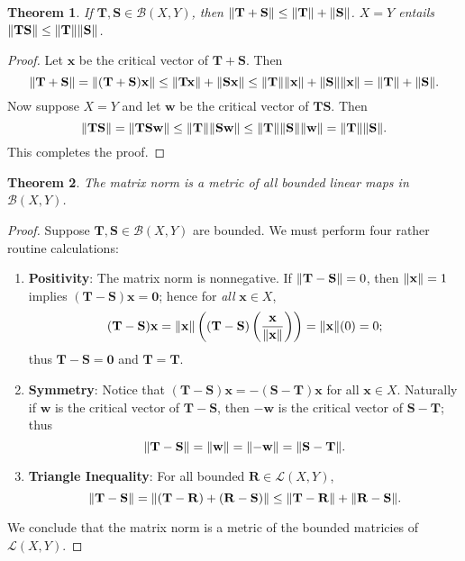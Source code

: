 \documentclass[11pt]{article}
\renewcommand{\vec}[1]{\mathbf{#1}}
\newcommand{\mat}[1]{\mathbf{#1}}
\newtheorem{theorem}{Theorem}
\begin{document}
\begin{theorem}
	If $\mat{T}, \mat{S} \in \mathcal{B}(X, Y)$, then $\norm{\mat{T} + \mat{S}} \le \norm{\mat{T}} + \norm{\mat{S}}$. $X = Y$ entails $\norm{\mat{TS}} \le \norm{\mat{T}} \norm{\mat{S}}$.
\end{theorem}
\begin{adjustwidth}{0.5cm}{}
	\begin{proof}
		Let $\vec{x}$ be the critical vector of $\mat{T} + \mat{S}$. Then
		\[
			\norm{\mat{T} + \mat{S}} = \norm{(\mat{T} + \mat{S})\vec{x}} \le \norm{\mat{T} \vec{x}} + \norm{\mat{S} \vec{x}} \le \norm{\mat{T}} \norm{\vec{x}} + \norm{\mat{S}} \norm{\vec{x}} = \norm{\mat{T}} + \norm{\mat{S}}.
		\]
		Now suppose $X = Y$ and let $\vec{w}$ be the critical vector of $\mat{TS}$. Then
		\[
			\norm{\mat{TS}} = \norm{\mat{TS} \vec{w}} \le \norm{\mat{T}} \norm{\mat{S} \vec{w}} \le \norm{\mat{T}} \norm{\mat{S}} \norm{\vec{w}} = \norm{\mat{T}} \norm{\mat{S}}.
		\]
		This completes the proof.
	\end{proof}
\end{adjustwidth}

\begin{theorem}
  The matrix norm is a metric of all bounded linear maps in $\mathcal{B}(X, Y)$.
\end{theorem}
\begin{adjustwidth}{0.5cm}{}
	\begin{proof}
		Suppose $\mat{T}, \mat{S} \in \mathcal{B}(X, Y)$ are bounded. We must perform four rather routine calculations:
		\begin{enumerate}
			\item \textbf{Positivity}: The matrix norm is nonnegative. If $\norm{\mat{T} - \mat{S}} = 0$, then $\norm{\vec{x}} = 1$ implies $(\mat{T} - \mat{S}) \vec{x} = \vec{0}$; hence for \textit{all} $\vec{x} \in X$,
			\[
				(\mat{T} - \mat{S}) \vec{x} = \norm{\vec{x}} \left( (\mat{T} - \mat{S}) \left( \frac{\vec{\vec{x}}}{\norm{\vec{x}}} \right) \right) = \norm{\vec{x}} (0) = 0;
			\]	
			thus $\mat{T} - \mat{S} = \mat{0}$ and $\mat{T} = \mat{T}$.
			\item \textbf{Symmetry}: Notice that $(\mat{T} - \mat{S}) \vec{x} = - (\mat{S} - \mat{T}) \vec{x}$ for all $\vec{x} \in X$. Naturally if $\vec{w}$ is the critical vector of $\mat{T} - \mat{S}$, then $- \vec{w}$ is the critical vector of $\mat{S} - \mat{T}$; thus
			\[
				\norm{\mat{T} - \mat{S}} = \norm{\vec{w}} = \norm{-\vec{w}} = \norm{\mat{S} - \mat{T}}.
			\]	
			\item \textbf{Triangle Inequality}: For all bounded $\mat{R} \in \mathcal{L}(X, Y)$,
			\[
				\norm{\mat{T - S}} = \norm{\mat{(T - R) + (R - S)}} \le \norm{\mat{T - R}} + \norm{\mat{R - S}}.
			\]
		\end{enumerate}
		We conclude that the matrix norm is a metric of the bounded matricies of $\mathcal{L}(X, Y)$.
	\end{proof}
\end{adjustwidth}
\end{document}
